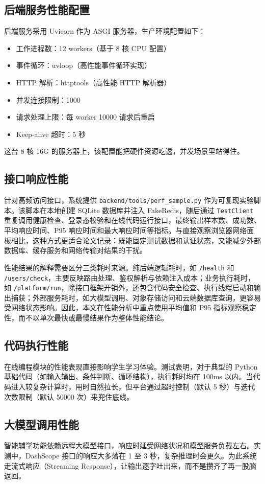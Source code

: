 \subsection{后端服务性能配置}
后端服务采用 Uvicorn 作为 ASGI 服务器，生产环境配置如下：
\begin{itemize}
  \item 工作进程数：12 workers（基于 8 核 CPU 配置）
  \item 事件循环：uvloop（高性能事件循环实现）
  \item HTTP 解析：httptools（高性能 HTTP 解析器）
  \item 并发连接限制：1000
  \item 请求处理上限：每 worker 10000 请求后重启
  \item Keep-alive 超时：5 秒
\end{itemize}

这台 8 核 16G 的服务器上，该配置能把硬件资源吃透，并发场景里站得住。

\subsection{接口响应性能}
针对高频访问接口，系统提供 \texttt{backend/tools/perf\_sample.py} 作为可复现实验脚本。该脚本在本地创建 SQLite 数据库并注入 FakeRedis，随后通过 \texttt{TestClient} 重复调用健康检查、登录态校验和在线代码运行接口，最终输出样本数、成功数、平均响应时间、P95 响应时间和最大响应时间等指标。与直接观察浏览器网络面板相比，这种方式更适合论文记录：既能固定测试数据和认证状态，又能减少外部数据库、缓存服务和网络传输对结果的干扰。

性能结果的解释需要区分三类耗时来源。纯后端逻辑耗时，如 \texttt{/health} 和 \texttt{/users/check}，主要反映路由处理、鉴权解析与依赖注入成本；业务执行耗时，如 \texttt{/platform/run}，除接口框架开销外，还包含代码安全检查、执行线程启动和输出捕获；外部服务耗时，如大模型调用、对象存储访问和云端数据库查询，更容易受网络状态影响。因此，本文在性能分析中重点使用平均值和 P95 指标观察稳定性，而不以单次最快或最慢结果作为整体性能结论。

\subsection{代码执行性能}
在线编程模块的性能表现直接影响学生学习体验。测试表明，对于典型的 Python 基础代码（如输入输出、条件判断、循环结构），执行耗时均在 100ms 以内。当代码进入较复杂计算时，用时自然拉长，但平台通过超时控制（默认 5 秒）与迭代次数限制（默认 50000 次）来兜住底线。

\subsection{大模型调用性能}
智能辅学功能依赖远程大模型接口，响应时延受网络状况和模型服务负载左右。实测中，DashScope 接口的响应大多落在 1 至 3 秒，复杂推理时会更久。为此系统走流式响应（Streaming Response），让输出逐字吐出来，而不是攒齐了再一股脑返回。

